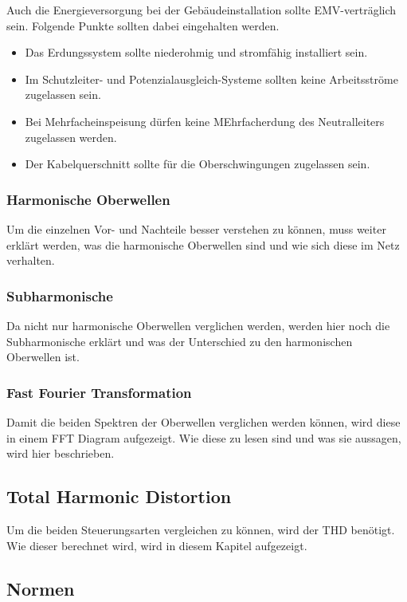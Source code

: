 Auch die Energieversorgung bei der Gebäudeinstallation sollte EMV-verträglich sein. Folgende Punkte sollten dabei eingehalten werden. 

\begin{itemize}
	\item Das Erdungssystem sollte niederohmig und stromfähig installiert sein.
	\item Im Schutzleiter- und Potenzialausgleich-Systeme sollten keine Arbeitsströme zugelassen sein.
	\item Bei Mehrfacheinspeisung dürfen keine MEhrfacherdung des Neutralleiters zugelassen werden.
	\item Der Kabelquerschnitt sollte für die Oberschwingungen zugelassen sein.
\end{itemize}  


\subsubsection{Harmonische Oberwellen}
Um die einzelnen Vor- und Nachteile besser verstehen zu können, muss weiter erklärt werden, was die harmonische Oberwellen sind und wie sich diese im Netz verhalten.
\subsubsection{Subharmonische}
Da nicht nur harmonische Oberwellen verglichen werden, werden hier noch die Subharmonische erklärt und was der Unterschied zu den harmonischen Oberwellen ist. 
\subsubsection{Fast Fourier Transformation}
Damit die beiden Spektren der Oberwellen verglichen werden können, wird diese in einem FFT Diagram aufgezeigt. Wie diese zu lesen sind und was sie aussagen, wird hier beschrieben. 

\subsection{Total Harmonic Distortion}
Um die beiden Steuerungsarten vergleichen zu können, wird der THD benötigt. Wie dieser berechnet wird, wird in diesem Kapitel aufgezeigt. 


\subsection{Normen}

